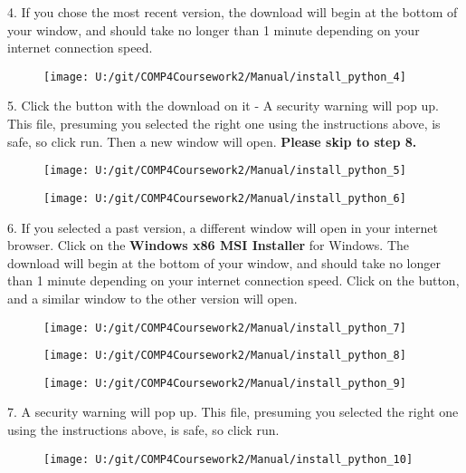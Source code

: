 4. If you chose the most recent version, the download will begin at the bottom of your window, and should take no longer than 1 minute depending on your internet connection speed.

\begin{figure}[H]
    \texttt{[image: U:/git/COMP4Coursework2/Manual/install\_python\_4]}
\end{figure}

5. Click the button with the download on it - A security warning will pop up. This file, presuming you selected the right one using the instructions above, is safe, so click run. Then a new window will open. \textbf{Please skip to step 8.}

\begin{figure}[H]
    \texttt{[image: U:/git/COMP4Coursework2/Manual/install\_python\_5]}
\end{figure}

\begin{figure}[H]
    \texttt{[image: U:/git/COMP4Coursework2/Manual/install\_python\_6]}
\end{figure}

6. If you selected a past version, a different window will open in your internet browser. Click on the \textbf{Windows x86 MSI Installer} for Windows. The download will begin at the bottom of your window, and should take no longer than 1 minute depending on your internet connection speed. Click on the button, and a similar window to the other version will open.

\begin{figure}[H]
    \texttt{[image: U:/git/COMP4Coursework2/Manual/install\_python\_7]}
\end{figure}

\begin{figure}[H]
    \texttt{[image: U:/git/COMP4Coursework2/Manual/install\_python\_8]}
\end{figure}

\begin{figure}[H]
    \texttt{[image: U:/git/COMP4Coursework2/Manual/install\_python\_9]}
\end{figure}

7. A security warning will pop up. This file, presuming you selected the right one using the instructions above, is safe, so click run.

\begin{figure}[H]
    \texttt{[image: U:/git/COMP4Coursework2/Manual/install\_python\_10]}
\end{figure}

